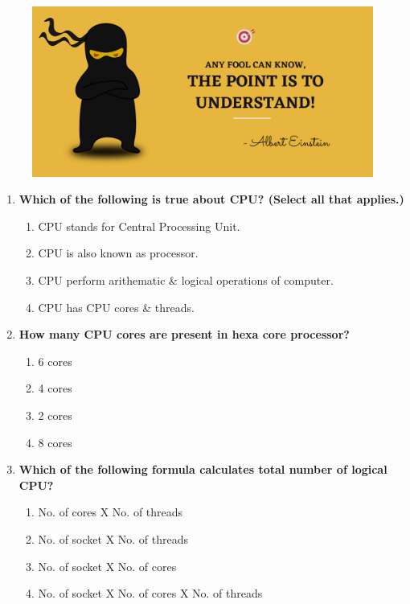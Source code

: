 \setlength{\columnsep}{3pt}
\begin{flushleft}
	
	\paragraph{}
	\bigskip
	
	\begin{figure}[h!]
		\centering
		\includegraphics[scale=.2]{content/practise.jpg}
	\end{figure}	
	\begin{enumerate}
		
		\item \textbf{Which of the following is true about CPU? (Select all that applies.)}
		\begin{enumerate}[label=(\alph*)]
			\item CPU stands for Central Processing Unit.  %
			\item CPU is also known as processor. %
			\item CPU perform arithematic \& logical operations of computer. %
			\item CPU has CPU cores \& threads. %
		\end{enumerate}
		\bigskip
		\bigskip
		
		\item \textbf{How many CPU cores are present in hexa core processor? }
		\begin{enumerate}[label=(\alph*)]
			\item 6 cores  %
			\item 4 cores
			\item 2 cores
			\item 8 cores
		\end{enumerate}
		\bigskip
		\bigskip	
		
		\item \textbf{Which of the following formula calculates total number of logical CPU?}
		\begin{enumerate}[label=(\alph*)]
			\item No. of cores X No. of threads
			\item No. of socket X No. of threads
			\item No. of socket X No. of cores
			\item No. of socket X No. of cores X No. of threads  %
		\end{enumerate}
		\bigskip
		\bigskip	



\end{enumerate}
\end{flushleft}
